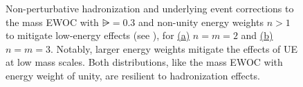\begin{figure}[t!]
    \centering
    \caption[Non-perturbative corrections to the mass EWOC with non-unity energy weights.]{
        Non-perturbative hadronization and underlying event corrections to the mass EWOC with \(\rsub=0.3\) and non-unity energy weights \(n > 1\) to mitigate low-energy effects (see ), for
        \hyperref[fig:m_ewoc:rsub_3:weight_2]{(a)}
        \(n=m=2\) and
        \hyperref[fig:m_ewoc:rsub_3:weight_3]{(b)}
        \(n=m=3\).
        Notably, larger energy weights mitigate the effects of UE at low mass scales.
        Both distributions, like the mass EWOC with energy weight of unity, are resilient to hadronization effects.
    }
    \label{fig:pp_to_ww:14TeV:weights}
\end{figure}


